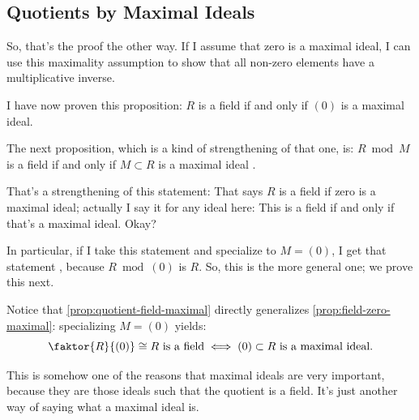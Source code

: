 \subsection{Quotients by Maximal Ideals}

\begin{speech}[00:20:21 - 00:21:28]
So, that's the proof the other way. If I assume that zero is a maximal ideal, I can use this maximality assumption to show that all non-zero elements have a multiplicative inverse.

I have now proven this proposition: $R$ is a field if and only if $(0)$ is a maximal ideal.

The next proposition, which is a kind of strengthening of that one, is: $R \bmod M$ is a field if and only if $M \subset R$ is a maximal ideal .

That's a strengthening of this statement: That says $R$ is a field if zero is a maximal ideal; actually I say it for any ideal here: This is a field if and only if that's a maximal ideal. Okay?

In particular, if I take this statement and specialize to $M = (0)$, I get that statement , because $R \bmod (0)$ is $R$. So, this is the more general one; we prove this next.
\end{speech}

\begin{content}

\begin{steps}[Specialization to $M = (0)$]
Notice that \cref{prop:quotient-field-maximal} directly generalizes \cref{prop:field-zero-maximal}: specializing $M = (0)$ yields:
\[
\faktor{R}{(0)} \cong R \text{ is a field} \iff (0) \subset R \text{ is a maximal ideal}.
\]
\end{steps}
\end{content}

\begin{speech}[00:21:28 - 00:21:49]
This is somehow one of the reasons that maximal ideals are very important, because they are those ideals such that the quotient is a field. It's just another way of saying what a maximal ideal is.
\end{speech}


